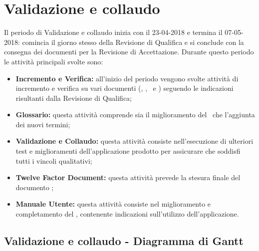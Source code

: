 \documentclass[PianoDiProgetto.tex]{subfiles}
\begin{document}
\section{Validazione e collaudo}
Il periodo di Validazione e collaudo inizia con il 23-04-2018 e termina il 07-05-2018: comincia il giorno stesso della Revisione di Qualifica e si conclude con la consegna dei documenti per la Revisione di Accettazione. Durante questo periodo le attività principali svolte sono:
\begin{itemize}
\item \textbf{Incremento e Verifica:} all’inizio del periodo vengono svolte attività di incremento e verifica su vari documenti (\ndp, \pdp, \pdq\ e \pb) seguendo le indicazioni risultanti dalla Revisione di Qualifica;
\item \textbf{Glossario:} questa attività comprende sia il miglioramento del \g\ che l’aggiunta dei nuovi termini;
\item \textbf{Validazione e Collaudo:} questa attività consiste nell’esecuzione di ulteriori test e miglioramenti dell'applicazione prodotto per assicurare che soddisfi tutti i vincoli qualitativi;
\item \textbf{Twelve Factor Document:} questa attività prevede la stesura finale del documento \tfd;
\item \textbf{Manuale Utente:} questa attività consiste nel miglioramento e completamento del \mut, contenente indicazioni sull’utilizzo dell'applicazione.

\end{itemize}
\begin{landscape}
\subsection{Validazione e collaudo - Diagramma di Gantt}
\end{landscape}	
\end{document}
